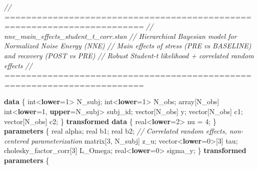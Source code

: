 \documentclass[
  english,
  man,floatsintext]{apa6}
\newenvironment{Shaded}{\begin{snugshade}}{\end{snugshade}}
\newcommand{\CommentTok}[1]{\textcolor[rgb]{0.56,0.35,0.01}{\textit{#1}}}
\newcommand{\DataTypeTok}[1]{\textcolor[rgb]{0.13,0.29,0.53}{#1}}
\newcommand{\DecValTok}[1]{\textcolor[rgb]{0.00,0.00,0.81}{#1}}
\newcommand{\KeywordTok}[1]{\textcolor[rgb]{0.13,0.29,0.53}{\textbf{#1}}}
\newcommand{\NormalTok}[1]{#1}
\begin{document}
\begin{Shaded}
\begin{Highlighting}[]
\CommentTok{// ========================================================================}
\CommentTok{// nne\_main\_effects\_student\_t\_corr.stan}
\CommentTok{// Hierarchical Bayesian model for Normalized Noise Energy (NNE)}
\CommentTok{// Main effects of stress (PRE vs BASELINE) and recovery (POST vs PRE)}
\CommentTok{// Robust Student{-}t likelihood + correlated random effects}
\CommentTok{// ========================================================================}

\KeywordTok{data}\NormalTok{ \{}
  \DataTypeTok{int}\NormalTok{\textless{}}\KeywordTok{lower}\NormalTok{=}\DecValTok{1}\NormalTok{\textgreater{} N\_subj;                              }
  \DataTypeTok{int}\NormalTok{\textless{}}\KeywordTok{lower}\NormalTok{=}\DecValTok{1}\NormalTok{\textgreater{} N\_obs;                              }
  \DataTypeTok{array}\NormalTok{[N\_obs] }\DataTypeTok{int}\NormalTok{\textless{}}\KeywordTok{lower}\NormalTok{=}\DecValTok{1}\NormalTok{, }\KeywordTok{upper}\NormalTok{=N\_subj\textgreater{} subj\_id;  }
  \DataTypeTok{vector}\NormalTok{[N\_obs] y;                                  }
  \DataTypeTok{vector}\NormalTok{[N\_obs] c1;                                 }
  \DataTypeTok{vector}\NormalTok{[N\_obs] c2;                                }
\NormalTok{\}}
\KeywordTok{transformed data}\NormalTok{ \{}
  \DataTypeTok{real}\NormalTok{\textless{}}\KeywordTok{lower}\NormalTok{=}\DecValTok{2}\NormalTok{\textgreater{} nu = }\DecValTok{4}\NormalTok{;                            }
\NormalTok{\}}
\KeywordTok{parameters}\NormalTok{ \{}
  \DataTypeTok{real}\NormalTok{ alpha;                                      }
  \DataTypeTok{real}\NormalTok{ b1;                                         }
  \DataTypeTok{real}\NormalTok{ b2;                                         }
  \CommentTok{// Correlated random effects, non{-}centered parameterization}
  \DataTypeTok{matrix}\NormalTok{[}\DecValTok{3}\NormalTok{, N\_subj] z\_u;                           }
  \DataTypeTok{vector}\NormalTok{\textless{}}\KeywordTok{lower}\NormalTok{=}\DecValTok{0}\NormalTok{\textgreater{}[}\DecValTok{3}\NormalTok{] tau;                          }
  \DataTypeTok{cholesky\_factor\_corr}\NormalTok{[}\DecValTok{3}\NormalTok{] L\_Omega;                 }
  \DataTypeTok{real}\NormalTok{\textless{}}\KeywordTok{lower}\NormalTok{=}\DecValTok{0}\NormalTok{\textgreater{} sigma\_y;                           }
\NormalTok{\}}
\KeywordTok{transformed parameters}\NormalTok{ \{}

\end{Highlighting}
\end{Shaded}
\end{document}
